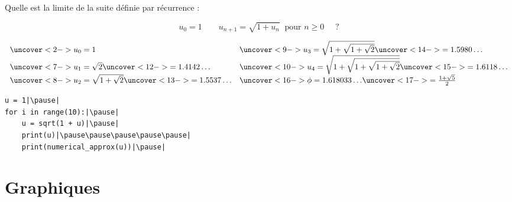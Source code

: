 \begin{frame}[fragile]

\begin{tp}
Quelle est la limite de la suite définie par récurrence :

\vspace*{-2ex}
$$u_0 = 1 \qquad u_{n+1} = \sqrt{1+u_n} \ \text{ pour } n \ge 0 \quad \text{ ?}$$
\end{tp}

\pause
$\begin{array}{ll}
\uncover<2->{u_0 = 1}            
& \uncover<9->{u_3 = \sqrt{1+\sqrt{1+\sqrt{2}}}} \uncover<14->{= 1.5980\ldots} \\
\uncover<7->{u_1 = \sqrt{2}} \uncover<12->{= 1.4142\ldots} 
& \uncover<10->{u_4 =\sqrt{1+\sqrt{1+\sqrt{1+\sqrt{2}}}}} \uncover<15->{= 1.6118\ldots}\\
\uncover<8->{u_2 =  \sqrt{1+\sqrt{2}}} \uncover<13->{= 1.5537\ldots} 
& \uncover<16->{\phi = 1.618033\ldots} \uncover<17->{= \frac{1+\sqrt{5}}{2}}\\
\end{array}$	
\pause
\begin{algo}
\begin{lstlisting}
u = 1|\pause|
for i in range(10):|\pause|
    u = sqrt(1 + u)|\pause|
    print(u)|\pause\pause\pause\pause\pause|
    print(numerical_approx(u))|\pause|
\end{lstlisting}
\end{algo}





\end{frame}






\section{Graphiques}

